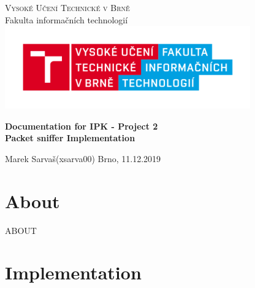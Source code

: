 \documentclass{article}
\begin{document}

	\begin{titlepage}
		\begin{center}
			\textsc{\Huge Vysoké Učení Technické v Brně} \\[0.7cm]
			{\Huge Fakulta informačních technologií}
			\center\includegraphics[width=0.5\linewidth]{./logo.png}

			\vspace{5cm}

			\textbf{{\Huge Documentation for IPK - Project 2}}\\[0.4cm]
			\textbf{{\LARGE Packet sniffer Implementation}}\\[0.4cm]
	
			
		\end{center}
		\vfill

		\begin{flushleft}
			\begin{Large}
				
				Marek Sarvaš\hspace{37px}(xsarva00)\hspace{19px} 
			\hfill
			Brno, 11.12.2019
			\end{Large}
		\end{flushleft}

	\end{titlepage}


	\tableofcontents
	\newpage


	\section{About}
	\large{ABOUT}
	\newpage
	\section{Implementation}
\end{document}
